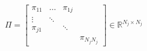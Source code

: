 \documentclass[11pt, a4paper]{article}
\begin{document}
% 
\begin{equation}
  \Pi = 
  \begin{bmatrix}
    \pi_{11} & \dots & \pi_{1j} & \\
    \vdots & \ddots & \\
    \pi_{j1} &  & \ddots \\
     & & & \pi_{N_jN_j}
  \end{bmatrix}
  \in \mathbb{R}^{N_j \times N_j}
\end{equation}
\end{document}
